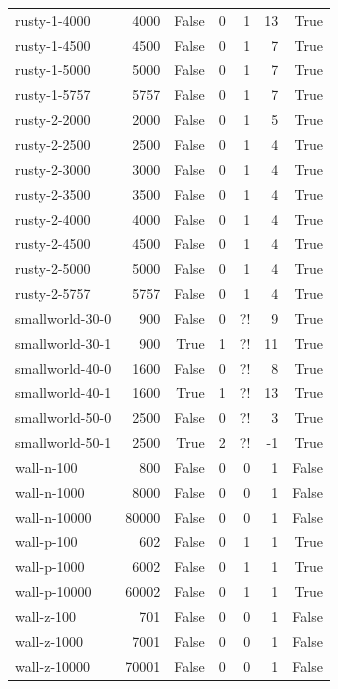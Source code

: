 \begin{tabular}{lrrrrrr}
rusty-1-4000 & 4000 & False & 0 & 1 & 13 & True \\
rusty-1-4500 & 4500 & False & 0 & 1 & 7 & True \\
rusty-1-5000 & 5000 & False & 0 & 1 & 7 & True \\
rusty-1-5757 & 5757 & False & 0 & 1 & 7 & True \\
rusty-2-2000 & 2000 & False & 0 & 1 & 5 & True \\
rusty-2-2500 & 2500 & False & 0 & 1 & 4 & True \\
rusty-2-3000 & 3000 & False & 0 & 1 & 4 & True \\
rusty-2-3500 & 3500 & False & 0 & 1 & 4 & True \\
rusty-2-4000 & 4000 & False & 0 & 1 & 4 & True \\
rusty-2-4500 & 4500 & False & 0 & 1 & 4 & True \\
rusty-2-5000 & 5000 & False & 0 & 1 & 4 & True \\
rusty-2-5757 & 5757 & False & 0 & 1 & 4 & True \\
smallworld-30-0 & 900 & False & 0 & ?! & 9 & True \\
smallworld-30-1 & 900 & True & 1 & ?! & 11 & True \\
smallworld-40-0 & 1600 & False & 0 & ?! & 8 & True \\
smallworld-40-1 & 1600 & True & 1 & ?! & 13 & True \\
smallworld-50-0 & 2500 & False & 0 & ?! & 3 & True \\
smallworld-50-1 & 2500 & True & 2 & ?! & -1 & True \\
wall-n-100 & 800 & False & 0 & 0 & 1 & False \\
wall-n-1000 & 8000 & False & 0 & 0 & 1 & False \\
wall-n-10000 & 80000 & False & 0 & 0 & 1 & False \\
wall-p-100 & 602 & False & 0 & 1 & 1 & True \\
wall-p-1000 & 6002 & False & 0 & 1 & 1 & True \\
wall-p-10000 & 60002 & False & 0 & 1 & 1 & True \\
wall-z-100 & 701 & False & 0 & 0 & 1 & False \\
wall-z-1000 & 7001 & False & 0 & 0 & 1 & False \\
wall-z-10000 & 70001 & False & 0 & 0 & 1 & False \\  \bottomrule
\end{tabular}